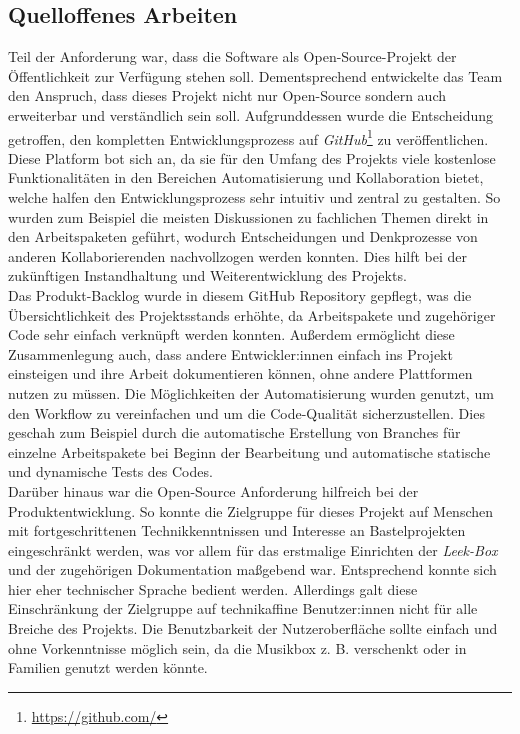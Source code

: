 \documentclass[10pt, a4paper]{article}
\begin{document}
\begin{onehalfspace}
  \subsection{Quelloffenes Arbeiten}
  Teil der Anforderung war, dass die Software als Open-Source-Projekt der Öffentlichkeit zur Verfügung stehen soll.
  Dementsprechend entwickelte das Team den Anspruch, dass dieses Projekt nicht nur Open-Source sondern auch erweiterbar und verständlich sein soll.
  Aufgrunddessen wurde die Entscheidung getroffen, den kompletten Entwicklungsprozess auf \textit{GitHub}\footnote{\url{https://github.com/}} zu veröffentlichen.
  Diese Platform bot sich an, da sie für den Umfang des Projekts viele kostenlose Funktionalitäten in den Bereichen Automatisierung und Kollaboration bietet, welche halfen den Entwicklungsprozess sehr intuitiv und zentral zu gestalten.
  So wurden zum Beispiel die meisten Diskussionen zu fachlichen Themen direkt in den Arbeitspaketen geführt, wodurch Entscheidungen und Denkprozesse von anderen Kollaborierenden nachvollzogen werden konnten.
  Dies hilft bei der zukünftigen Instandhaltung und Weiterentwicklung des Projekts.
  \\
  Das Produkt-Backlog wurde in diesem GitHub Repository gepflegt,
   was die Übersichtlichkeit des Projektsstands erhöhte, da Arbeitspakete und zugehöriger Code sehr einfach verknüpft werden konnten.
  Außerdem ermöglicht diese Zusammenlegung auch, dass andere Entwickler:innen einfach ins Projekt einsteigen und ihre Arbeit dokumentieren können, ohne andere Plattformen nutzen zu müssen.
  Die Möglichkeiten der Automatisierung wurden genutzt, um den Workflow zu vereinfachen und um die Code-Qualität sicherzustellen.
  Dies geschah zum Beispiel durch die automatische Erstellung von Branches für einzelne Arbeitspakete bei Beginn der Bearbeitung und automatische statische und dynamische Tests des Codes.
  \\
  Darüber hinaus war die Open-Source Anforderung hilfreich bei der Produktentwicklung.
  So konnte die Zielgruppe für dieses Projekt auf Menschen mit fortgeschrittenen Technikkenntnissen und Interesse an Bastelprojekten eingeschränkt werden,
   was vor allem für das erstmalige Einrichten der \textit{Leek-Box} und der zugehörigen Dokumentation maßgebend war.
  Entsprechend konnte sich hier eher technischer Sprache bedient werden.
  Allerdings galt diese Einschränkung der Zielgruppe auf technikaffine Benutzer:innen nicht für alle Breiche des Projekts.
  Die Benutzbarkeit der Nutzeroberfläche sollte einfach und ohne Vorkenntnisse möglich sein, da die Musikbox z. B. verschenkt oder in Familien genutzt werden könnte.


\end{onehalfspace}
\end{document}
